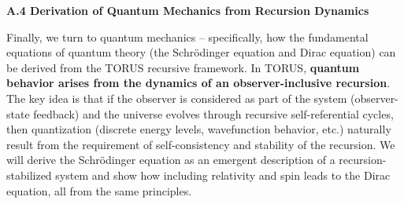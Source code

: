 \documentclass[
]{article}
\begin{document}
\textbf{A.4 Derivation of Quantum Mechanics from Recursion Dynamics}

Finally, we turn to quantum mechanics -- specifically, how the
fundamental equations of quantum theory (the Schrödinger equation and
Dirac equation) can be derived from the TORUS recursive framework. In
TORUS, \textbf{quantum behavior arises from the dynamics of an
observer-inclusive recursion}. The key idea is that if the observer is
considered as part of the system (observer-state feedback) and the
universe evolves through recursive self-referential cycles, then
quantization (discrete energy levels, wavefunction behavior, etc.)
naturally result from the requirement of self-consistency and stability
of the recursion. We will derive the Schrödinger equation as an emergent
description of a recursion-stabilized system and show how including
relativity and spin leads to the Dirac equation, all from the same
principles.
\end{document}
